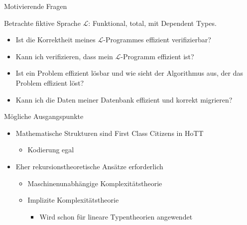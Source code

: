 \documentclass[11pt,aspectratio=169,notheorems]{beamer}
\begin{document}
\begin{frame}{Motivierende Fragen}
    \begin{center}
        Betrachte fiktive Sprache $\mathcal{L}$: Funktional, total, mit Dependent Types.
    \end{center}
    \begin{itemize}
        \item Ist die Korrektheit meines $\mathcal{L}$-Programmes effizient verifizierbar?
        \item Kann ich verifizieren, dass mein $\mathcal{L}$-Programm effizient ist?
        \item Ist ein Problem effizient lösbar und wie sieht der Algorithmus aus, der das Problem effizient löst?
        \item Kann ich die Daten meiner Datenbank effizient und korrekt migrieren?
    \end{itemize}
\end{frame}

\begin{frame}{Mögliche Ausgangspunkte}
    \begin{itemize}
        \item Mathematische Strukturen sind \glqq{}First Class Citizens\grqq{} in HoTT
        \begin{itemize}
            \item Kodierung egal
        \end{itemize}
        \item Eher rekursionstheoretische Ansätze erforderlich~\cite{ctinctt}
        \begin{itemize}
            \item Maschinenunabhängige Komplexitätstheorie
            \item Implizite Komplexitätstheorie~\cite{icc}
            \begin{itemize}
                \item Wird schon für lineare Typentheorien angewendet
            \end{itemize}
        \end{itemize}
    \end{itemize}
\end{frame}
\end{document}
